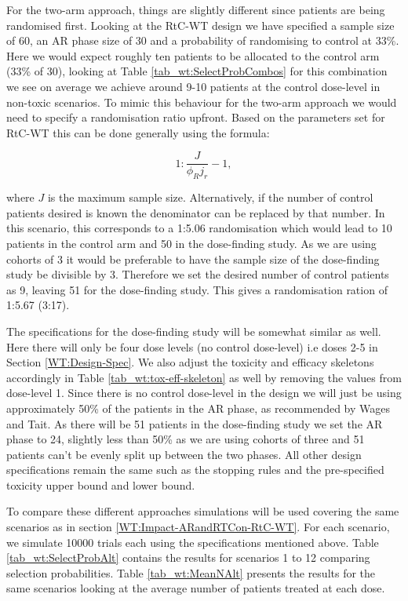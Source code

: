 For the two-arm approach, things are slightly different since patients are being randomised first. Looking at the RtC-WT design we have specified a sample size of 60, an AR phase size of 30 and a probability of randomising to control at 33\%. Here we would expect roughly ten patients to be allocated to the control arm (33\% of 30), looking at Table \ref{tab_wt:SelectProbCombos} for this combination we see on average we achieve around 9-10 patients at the control dose-level in non-toxic scenarios. To mimic this behaviour for the two-arm approach we would need to specify a randomisation ratio upfront. Based on the parameters set for RtC-WT this can be done generally using the formula:

\begin{equation}
	1 : \frac{J}{\phi_R j_r} - 1,
\end{equation}

where $J$ is the maximum sample size. Alternatively, if the number of control patients desired is known the denominator can be replaced by that number. In this scenario, this corresponds to a 1:5.06 randomisation which would lead to 10 patients in the control arm and 50 in the dose-finding study. As we are using cohorts of 3 it would be preferable to have the sample size of the dose-finding study be divisible by 3. Therefore we set the desired number of control patients as 9, leaving 51 for the dose-finding study. This gives a randomisation ration of 1:5.67 (3:17). 

The specifications for the dose-finding study will be somewhat similar as well. Here there will only be four dose levels (no control dose-level) i.e doses 2-5 in Section \ref{WT:Design-Spec}. We also adjust the toxicity and efficacy skeletons accordingly in Table \ref{tab_wt:tox-eff-skeleton} as well by removing the values from dose-level 1. Since there is no control dose-level in the design we will just be using approximately 50\% of the patients in the AR phase, as recommended by Wages and Tait. As there will be 51 patients in the dose-finding study we set the AR phase to 24, slightly less than 50\% as we are using cohorts of three and 51 patients can't be evenly split up between the two phases. All other design specifications remain the same such as the stopping rules and the pre-specified toxicity upper bound and lower bound. 

To compare these different approaches simulations will be used covering the same scenarios as in section \ref{WT:Impact-ARandRTCon-RtC-WT}. For each scenario, we simulate 10000 trials each using the specifications mentioned above. Table \ref{tab_wt:SelectProbAlt} contains the results for scenarios 1 to 12 comparing selection probabilities. Table \ref{tab_wt:MeanNAlt} presents the results for the same scenarios looking at the average number of patients treated at each dose.  

